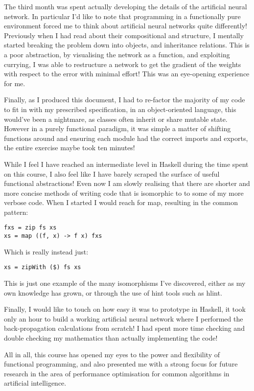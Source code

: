 \documentclass[a4paper]{article}
\begin{document}
The third month was spent actually developing the
details of the artificial neural network. In particular I'd like to note that
programming in a functionally pure environment forced me to think about
artificial neural networks quite differently! Previously when I had read about
their compositional and structure, I mentally started breaking the problem down
into objects, and inheritance relations. This is a poor abstraction, by
visualising the network as a function, and exploiting currying, I was able to
restructure a network to get the gradient of the weights with respect to the
error with minimal effort! This was an eye-opening experience for me.

Finally, as I produced this document, I had to re-factor the majority of my 
code
to fit in with my prescribed specification, in an object-oriented language,
this would've been a nightmare, as classes often inherit or share mutable
state. However in a purely functional paradigm, it was simple a matter of
shifting functions around and ensuring each module had the correct imports and
exports, the entire exercise maybe took ten minutes!

While I feel I have reached an intermediate level in Haskell during the time
spent on this course, I also feel like I have barely scraped the surface of
useful functional abstractions! Even now I am slowly realising that there are 
shorter and more concise methods of writing code that is isomorphic to
to some of my more verbose code. When I started I would
reach for map, resulting in the common pattern:
\begin{verbatim}
fxs = zip fs xs
xs = map ((f, x) -> f x) fxs
\end{verbatim}
Which is really instead just:
\begin{verbatim}
xs = zipWith ($) fs xs
\end{verbatim}
This is just one example of the many isomorphisms I've discovered, either as my
own knowledge has grown, or through the use of hint tools such as hlint.

Finally, I would like to touch on how easy it was to prototype in Haskell,
it took only an hour to build a working artificial neural network where I
performed the back-propagation calculations from scratch! I had spent more time
checking and double checking my mathematics than actually implementing the
code!

All in all, this course has opened my eyes to the power and flexibility of
functional programming, and also presented me with a strong focus for future
research in the area of performance optimisation for common algorithms in
artificial intelligence.
{}

\end{document}
